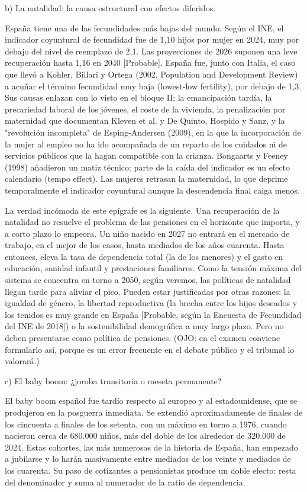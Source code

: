 \documentclass[10pt,a4paper]{article}
\begin{document}
b) La natalidad: la causa estructural con efectos diferidos.

España tiene una de las fecundidades más bajas del mundo. Según el INE, el indicador coyuntural de fecundidad fue de 1,10 hijos por mujer en 2024, muy por debajo del nivel de reemplazo de 2,1. Las proyecciones de 2026 suponen una leve recuperación hasta 1,16 en 2040 [Probable]. España fue, junto con Italia, el caso que llevó a Kohler, Billari y Ortega (2002, Population and Development Review) a acuñar el término fecundidad muy baja (lowest-low fertility), por debajo de 1,3. Sus causas enlazan con lo visto en el bloque II: la emancipación tardía, la precariedad laboral de los jóvenes, el coste de la vivienda, la penalización por maternidad que documentan Kleven et al. y De Quinto, Hospido y Sanz, y la "revolución incompleta" de Esping-Andersen (2009), en la que la incorporación de la mujer al empleo no ha ido acompañada de un reparto de los cuidados ni de servicios públicos que la hagan compatible con la crianza. Bongaarts y Feeney (1998) añadieron un matiz técnico: parte de la caída del indicador es un efecto calendario (tempo effect). Las mujeres retrasan la maternidad, lo que deprime temporalmente el indicador coyuntural aunque la descendencia final caiga menos.

La verdad incómoda de este epígrafe es la siguiente. Una recuperación de la natalidad no resuelve el problema de las pensiones en el horizonte que importa, y a corto plazo lo empeora. Un niño nacido en 2027 no entrará en el mercado de trabajo, en el mejor de los casos, hasta mediados de los años cuarenta. Hasta entonces, eleva la tasa de dependencia total (la de los menores) y el gasto en educación, sanidad infantil y prestaciones familiares. Como la tensión máxima del sistema se concentra en torno a 2050, según veremos, las políticas de natalidad llegan tarde para aliviar el pico. Pueden estar justificadas por otras razones: la igualdad de género, la libertad reproductiva (la brecha entre los hijos deseados y los tenidos es muy grande en España [Probable, según la Encuesta de Fecundidad del INE de 2018]) o la sostenibilidad demográfica a muy largo plazo. Pero no deben presentarse como política de pensiones. (OJO: en el examen conviene formularlo así, porque es un error frecuente en el debate público y el tribunal lo valorará.)

c) El baby boom: ¿joroba transitoria o meseta permanente?

El baby boom español fue tardío respecto al europeo y al estadounidense, que se produjeron en la posguerra inmediata. Se extendió aproximadamente de finales de los cincuenta a finales de los setenta, con un máximo en torno a 1976, cuando nacieron cerca de 680.000 niños, más del doble de los alrededor de 320.000 de 2024. Estas cohortes, las más numerosas de la historia de España, han empezado a jubilarse y lo harán masivamente entre mediados de los veinte y mediados de los cuarenta. Su paso de cotizantes a pensionistas produce un doble efecto: resta del denominador y suma al numerador de la ratio de dependencia.
\end{document}
